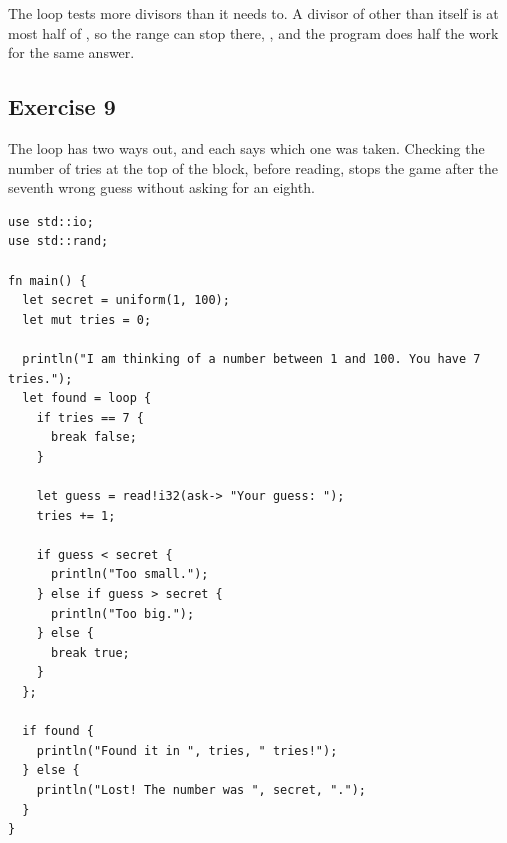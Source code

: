 The loop tests more divisors than it needs to. A divisor of  other
than  itself is at most half of , so the range can stop there,
, and the program does half the work for the same answer.

\subsection*{Exercise 9}

The loop has two ways out, and each  says which one was taken.
Checking the number of tries at the top of the block, before reading, stops the
game after the seventh wrong guess without asking for an eighth.

\begin{lstlisting}[style=coloredverbatim, caption=Solution for exercise 9]
use std::io;
use std::rand;

fn main() {
  let secret = uniform(1, 100);
  let mut tries = 0;

  println("I am thinking of a number between 1 and 100. You have 7 tries.");
  let found = loop {
    if tries == 7 {
      break false;
    }

    let guess = read!i32(ask-> "Your guess: ");
    tries += 1;

    if guess < secret {
      println("Too small.");
    } else if guess > secret {
      println("Too big.");
    } else {
      break true;
    }
  };

  if found {
    println("Found it in ", tries, " tries!");
  } else {
    println("Lost! The number was ", secret, ".");
  }
}
\end{lstlisting}
